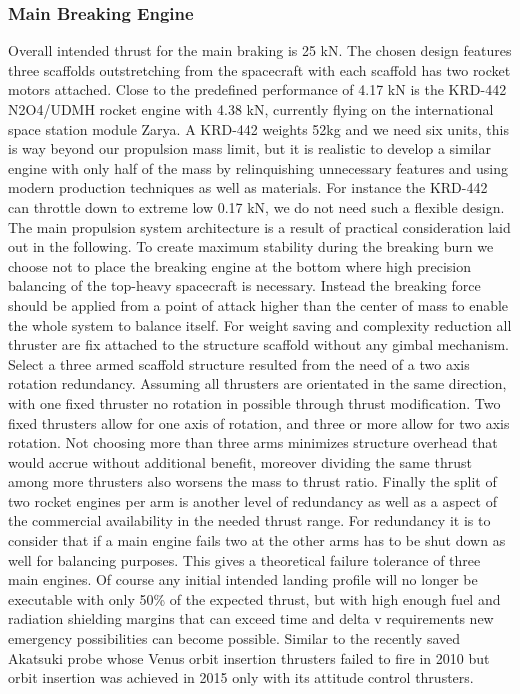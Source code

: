 \subsubsection{Main Breaking Engine} 
Overall intended thrust for the main braking is 25 kN. The chosen design features three scaffolds outstretching from the spacecraft with each scaffold has two rocket motors attached. Close to the predefined performance of 4.17 kN is the KRD-442 \cite{AstronauticaKRD} N2O4/UDMH rocket engine with 4.38 kN, currently flying on the international space station module Zarya. A KRD-442 weights 52kg and we need six units, this is way beyond our propulsion mass limit, but it is realistic to develop a similar engine with only half of the mass by relinquishing unnecessary features and using modern production techniques as well as materials. For instance the KRD-442 can throttle down to extreme low 0.17 kN, we do not need such a flexible design.\\
The main propulsion system architecture is a result of practical consideration laid out in the following. To create maximum stability during the breaking burn we choose not to place the breaking engine at the bottom where high precision balancing of the top-heavy spacecraft is necessary. Instead the breaking force should be applied from a point of attack higher than the center of mass to enable the whole system to balance itself. For weight saving and complexity reduction all thruster are fix attached to the structure scaffold without any gimbal mechanism. Select a three armed scaffold structure resulted from the need of a two axis rotation redundancy. Assuming all thrusters are orientated in the same direction, with one fixed thruster no rotation in possible through thrust modification. Two fixed thrusters allow for one axis of rotation, and three or more allow for two axis rotation. Not choosing more than three arms minimizes structure overhead that would accrue without additional benefit, moreover dividing the same thrust among more thrusters also worsens the mass to thrust ratio. Finally the split of two rocket engines per arm is another level of redundancy as well as a aspect of the commercial availability in the needed thrust range. For redundancy it is to consider that if a main engine fails two at the other arms has to be shut down as well for balancing purposes. This gives a theoretical failure tolerance of three main engines. Of course any initial intended landing profile will no longer be executable with only 50\% of the expected thrust, but with high enough fuel and radiation shielding margins that can exceed time and delta v requirements new emergency possibilities can become possible. Similar to the recently saved Akatsuki \cite{AkatsukiRescue} probe whose Venus orbit insertion thrusters failed to fire in 2010 but orbit insertion was achieved in 2015 only with its attitude control thrusters.\\

